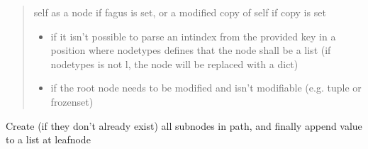 \documentclass[a4paper,10pt,english]{sphinxmanual}
\begin{document}
\begin{fulllineitems}
\begin{fulllineitems}
\begin{quote}
\begin{description}
\begin{itemize}
\end{itemize}

\sphinxAtStartPar
self as a node if fagus is set, or a modified copy of self if copy is set

\begin{itemize}
\item {}
\sphinxAtStartPar
{} \textendash{} if it isn’t possible to parse an int\sphinxhyphen{}index from the provided key in a position where node\sphinxhyphen{}types
    defines that the node shall be a list (if node\sphinxhyphen{}types is not l, the node will be replaced with a dict)

\item {}
\sphinxAtStartPar
{} \textendash{} if the root node needs to be modified and isn’t modifiable (e.g. tuple or frozenset)

\end{itemize}

\end{description}\end{quote}

\end{fulllineitems}


\begin{fulllineitems}
\label{\detokenize{fagus.fagus:fagus.fagus.Fagus.append}}
\pysigstartsignatures
{}
\pysigstopsignatures
\sphinxAtStartPar
Create (if they don’t already exist) all sub\sphinxhyphen{}nodes in path, and finally append value to a list at leaf\sphinxhyphen{}node


\end{fulllineitems}
\end{fulllineitems}
\end{document}
